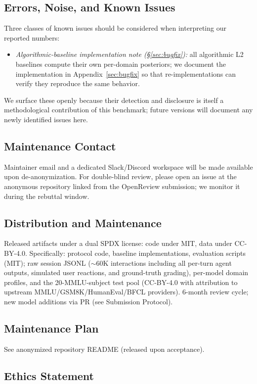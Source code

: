\documentclass[11pt]{article}
\begin{document}
\subsection*{Errors, Noise, and Known Issues}
Three classes of known issues should be considered when interpreting our reported numbers:
\begin{itemize}[nosep,leftmargin=1.4em]
  \item \emph{Algorithmic-baseline implementation note (\S\ref{sec:bugfix}):} all algorithmic L2 baselines compute their own per-domain posteriors; we document the implementation in Appendix~\ref{sec:bugfix} so that re-implementations can verify they reproduce the same behavior.
\end{itemize}
We surface these openly because their detection and disclosure is itself a methodological contribution of this benchmark; future versions will document any newly identified issues here.

\subsection*{Maintenance Contact}
Maintainer email and a dedicated Slack/Discord workspace will be made available upon de-anonymization. For double-blind review, please open an issue at the anonymous repository linked from the OpenReview submission; we monitor it during the rebuttal window.

\subsection*{Distribution and Maintenance}
Released artifacts under a dual SPDX license: code under MIT, data under CC-BY-4.0. Specifically: protocol code, baseline implementations, evaluation scripts (MIT); raw session JSONL ($\sim$60K interactions including all per-turn agent outputs, simulated user reactions, and ground-truth grading), per-model domain profiles, and the 20-MMLU-subject test pool (CC-BY-4.0 with attribution to upstream MMLU/GSM8K/HumanEval/BFCL providers). 6-month review cycle; new model additions via PR (see Submission Protocol).


\subsection{Maintenance Plan}
See anonymized repository README (released upon acceptance).


\subsection{Ethics Statement}
\end{document}

